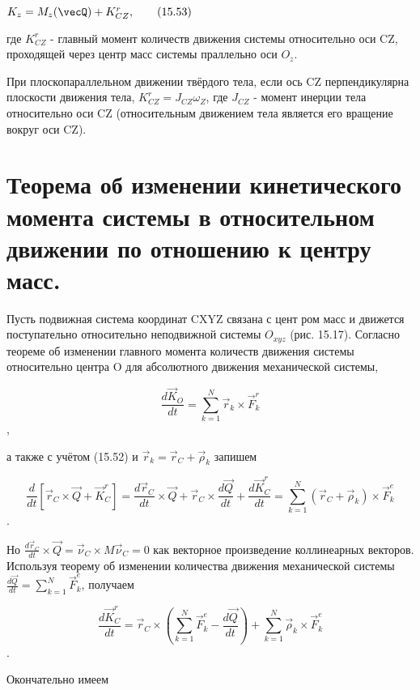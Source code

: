 {\begin{center}
	  \par $K_z = M_z (\vecQ) + K_{CZ}^r, \qquad (15.53)$

	  \par где $K_{CZ}^r$ - главный момент количеств движения системы относительно оси CZ, проходящей через центр масс системы праллельно оси $O_z$.

	  \par При плоскопараллельном движении твёрдого тела, если ось CZ перпендикулярна плоскости движения тела, $K_{CZ}^r = J_{CZ} \omega_Z$, где $J_{CZ}$ - момент инерции тела относительно оси CZ (относительным движением тела является его вращение вокруг оси  CZ). 
\end{center}
\section{Теорема об изменении кинетического момента системы в относительном движении по отношению к центру масс.}
\begin{center}
    \par Пусть подвижная система координат CXYZ связана с цент ром масс и движется поступательно относительно неподвижной системы $O_{xyz}$ (рис. 15.17). Согласно теореме об изменении главного момента количеств движения системы относительно центра O для абсолютного движения механической системы,

	  $$\frac{d \vec K_O}{dt} = \sum\limits_{k=1}^N \vec r_k \times \vec F_k^r$$,

	  \par а также с учётом (15.52) и $\vec r_k = \vec r_C + \vec\rho_k$ запишем

	  $$\frac{d}{dt} [\vec r_C \times \vec Q + \vec K_C^r] = \frac{d \vec r_C}{dt} \times \vec Q + \vec r_C \times \frac{d \vec Q}{dt} + \frac{d \vec K_C^r}{dt} = \sum\limits_{k=1}^N (\vec r_C + \vec\rho_k) \times \vec F_k^e$$.

	  \par Но $\frac{d \vec r_C}{dt} \times \vec Q = \vec\nu_C \times M \vec\nu_C = 0$ как  векторное  произведение  коллинеарных векторов. Используя теорему об изменении количества движения механической системы $ \frac{d \vec Q}{dt} = \sum\limits_{k=1}^N \vec F_k^e$, получаем

	  $$\frac{d \vec K_C^r}{dt} = \vec r_C \times (\sum\limits_{k=1}^N \vec F_k^e - \frac{d \vec Q}{dt}) + \sum\limits_{k=1}^N \vec\rho_k \times \vec F_k^e$$.

	  \par Окончательно имеем


\end{center}}

